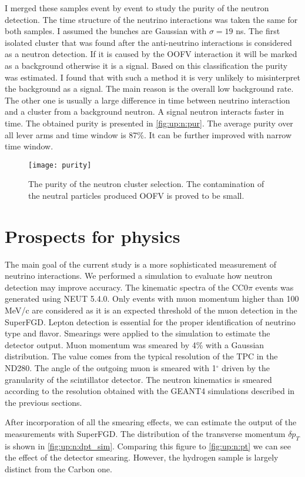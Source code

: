 \documentclass[main.tex]{subfiles}
\begin{document}
I merged these samples event by event to study the purity of the neutron detection. The time structure of the neutrino interactions was taken the same for both samples. I assumed the bunches are Gaussian with $\sigma=19$ ns.  The first isolated cluster that was found after the anti-neutrino interactions is considered as a neutron detection. If it is caused by the OOFV interaction it will be marked as a background otherwise it is a signal. Based on this classification the purity was estimated. I found that with such a method it is very unlikely to misinterpret the background as a signal. The main reason is the overall low background rate. The other one is usually a large difference in time between neutrino interaction and a cluster from a background neutron. A signal neutron interacts faster in time. The obtained purity is presented in \autoref{fig:up:n:pur}. The average purity over all lever arms and time window is 87\%. It can be further improved with narrow time window.

\begin{figure}[!ht]
  \centering
  \texttt{[image: purity]}
  \caption{The purity of the neutron cluster selection. The contamination of the neutral particles produced OOFV is proved to be small.}
  \label{fig:up:n:pur}
\end{figure}


\section{Prospects for physics}
\label{sec:up:n:phys}
The main goal of the current study is a more sophisticated measurement of neutrino interactions. We performed a simulation to evaluate how neutron detection may improve accuracy. The kinematic spectra of the CC0$\pi$ events was generated using NEUT 5.4.0. Only events with muon momentum higher than 100 MeV/c are considered as it is an expected threshold of the muon detection in the SuperFGD. Lepton detection is essential for the proper identification of neutrino type and flavor. Smearings were applied to the simulation to estimate the detector output. Muon momentum was smeared by 4\% with a Gaussian distribution. The value comes from the typical resolution of the TPC in the ND280. The angle of the outgoing muon is smeared with 1${}^\circ$ driven by the granularity of the scintillator detector. The neutron kinematics is smeared according to the resolution obtained with the GEANT4 simulations described in the previous sections.

After incorporation of all the smearing effects, we can estimate the output of the measurements with SuperFGD. The distribution of the transverse momentum $\delta p_T$ is shown in \autoref{fig:up:n:dpt_sim}. Comparing this figure to \autoref{fig:up:n:pt} we can see the effect of the detector smearing. However, the hydrogen sample is largely distinct from the Carbon one.
\end{document}
